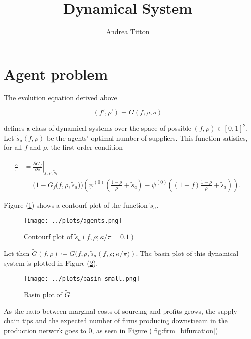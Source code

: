 \documentclass[american, abstract=on]{scrartcl}
\author{Andrea Titton}
\title{Dynamical System}
\theoremstyle{plain}
\begin{document}
\maketitle

\section{Agent problem}

The evolution equation derived above

\begin{equation}
    (f', \rho') = G(f, \rho, s)
\end{equation}

defines a class of dynamical systems over the space of possible $(f, \rho) \in [0, 1]^2$. Let $\tilde{s}_a(f, \rho)$ be the agents' optimal number of suppliers. This function satisfies, for all $f$ and $\rho$, the first order condition

\begin{equation}
    \begin{split}
        \frac{\kappa}{\pi} &= \left.\frac{\partial G_f}{\partial s}\right\vert_{f, \rho, \tilde{s}_a} \\
        &= \Big(1 - G_f\big(f, \rho, \tilde{s}_a\big)\Big) \left(\psi^{(0)}\left(\frac{1 - \rho}{\rho} + \tilde{s}_a\right) -  \psi^{(0)}\left((1 - f)\frac{1 - \rho}{\rho} + \tilde{s}_a\right) \right).
    \end{split}
\end{equation}

Figure (\ref{fig:firm_optimum}) shows a contourf plot of the function $\tilde{s}_a$.

\begin{figure}[H]
    \centering
    \texttt{[image: ../plots/agents.png]}
    \caption{Contourf plot of $\tilde{s}_a(f, \rho; \kappa / \pi = 0.1)$}
    \label{fig:firm_optimum}
\end{figure}

Let then $\tilde{G}(f, \rho) \coloneqq G\big(f, \rho, \tilde{s}_a(f, \rho; \kappa / \pi\big) )$. The basin plot of this dynamical system is plotted in Figure (\ref{fig:firm_basin}).

\begin{figure}[H]
    \centering
    \texttt{[image: ../plots/basin\_small.png]}
    \caption{Basin plot of $\tilde{G}$}
    \label{fig:firm_basin}
\end{figure}

As the ratio between marginal costs of sourcing and profits grows, the supply chain tips and the expected number of firms producing downstream in the production network goes to $0$, as seen in Figure (\ref{fig:firm_bifurcation})
\end{document}
